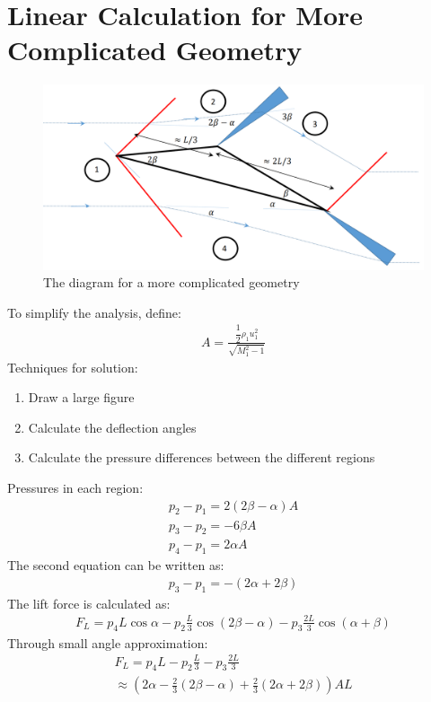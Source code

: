 \documentclass[class=report, crop=false, 12pt,a4paper]{standalone}
\begin{document}
\section{Linear Calculation for More Complicated Geometry}
\begin{figure}[H]
    \centering
    \includegraphics[width = 0.9 \textwidth]{../img/diagram35.png}
    \caption{The diagram for a more complicated geometry}
\end{figure}
To simplify the analysis, define: 
\begin{gather}
    A = \frac{\dfrac{1}{2}\rho_1 u_1^2}{\sqrt{M_1^2-1}}
\end{gather}
Techniques for solution: 
\begin{enumerate}[noitemsep]
    \item Draw a large figure
    \item Calculate the deflection angles
    \item Calculate the pressure differences between the different regions
\end{enumerate}
Pressures in each region: 
\begin{gather}
    p_2-p_1 = 2(2\beta-\alpha)A \\[5pt]
    p_3-p_2 = -6\beta A \\[5pt]
    p_4-p_1 = 2\alpha A
\end{gather}
The second equation can be written as: 
\begin{gather}
    p_3-p_1 = -(2\alpha+2\beta)
\end{gather}
The lift force is calculated as: 
\begin{gather}
    F_L = p_4L\cos\alpha - p_2\frac{L}{3}\cos(2\beta-\alpha) - p_3\frac{2L}{3}\cos(\alpha+\beta) 
\end{gather}
Through small angle approximation: 
\begin{gather}
    F_L = p_4L - p_2\frac{L}{3} - p_3\frac{2L}{3} \\[5pt]
    \approx \left( 2\alpha - \frac{2}{3}(2\beta-\alpha) + \frac{2}{3}(2\alpha+2\beta) \right) AL
\end{gather}
\end{document}
